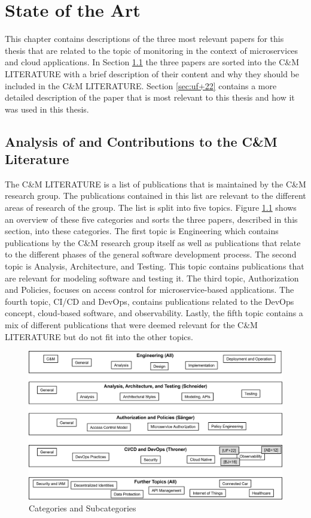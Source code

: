 \chapter{State of the Art}
\label{cha:state_of_the_art}

This chapter contains descriptions of the three most relevant papers for this thesis that are related to the topic
of monitoring in the context of microservices and cloud applications. In Section \ref{sec:cm_literature}
the three papers are sorted into the C\&M LITERATURE with a brief description of their content
and why they should be included in the C\&M LITERATURE. Section \ref{sec:uf+22}
contains a more detailed description of the paper that is most relevant to this thesis
and how it was used in this thesis.

\section{Analysis of and Contributions to the C\&M Literature}
\label{sec:cm_literature}

The C\&M LITERATURE is a list of publications that is maintained by the C\&M research group.
The publications contained in this list are relevant to the different areas of research of the group.
The list is split into five topics. Figure \ref{fig:categories_subcategories} shows an overview of these five categories and
sorts the three papers, described in this section, into these categories. The first topic is Engineering which contains publications
by the C\&M research group itself as well as publications that relate to the different phases
of the general software development process. The second topic is Analysis, Architecture, and Testing.
This topic contains publications that are relevant for modeling software and testing it.
The third topic, Authorization and Policies, focuses on access control for microservice-based applications.
The fourth topic, CI/CD and DevOps, contains publications related to the DevOps concept,
cloud-based software, and observability. Lastly, the fifth topic contains a mix of different publications
that were deemed relevant for the C\&M LITERATURE but do not fit into the other topics.

\begin{figure}[tb]
    \centering
    \includegraphics[width=\linewidth]{figures/3.1_literature.png}
    \caption{Categories and Subcategories}
    \label{fig:categories_subcategories}
\end{figure}

